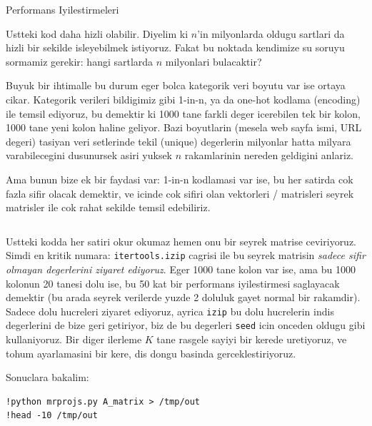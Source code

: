 \documentclass[12pt,fleqn]{article}\usepackage{../common}
\begin{document}
Performans Iyilestirmeleri

Ustteki kod daha hizli olabilir. Diyelim ki $n$'in milyonlarda oldugu
sartlari da hizli bir sekilde isleyebilmek istiyoruz. Fakat bu noktada
kendimize su soruyu sormamiz gerekir: hangi sartlarda $n$ milyonlari
bulacaktir?

Buyuk bir ihtimalle bu durum eger bolca kategorik veri boyutu var ise
ortaya cikar. Kategorik verileri bildigimiz gibi 1-in-n, ya da one-hot
kodlama (encoding) ile temsil ediyoruz, bu demektir ki 1000 tane
farkli deger icerebilen tek bir kolon, 1000 tane yeni kolon haline
geliyor. Bazi boyutlarin (mesela web sayfa ismi, URL degeri) tasiyan
veri setlerinde tekil (unique) degerlerin milyonlar hatta milyara
varabilecegini dusunursek asiri yuksek $n$ rakamlarinin nereden
geldigini anlariz.

Ama bunun bize ek bir faydasi var: 1-in-n kodlamasi var ise, bu her
satirda cok fazla sifir olacak demektir, ve icinde cok sifiri olan
vektorleri / matrisleri seyrek matrisler ile cok rahat sekilde temsil
edebiliriz.

\inputminted[fontsize=\footnotesize]{python}{mrprojs.py}

Ustteki kodda her satiri okur okumaz hemen onu bir seyrek matrise
ceviriyoruz. Simdi en kritik numara: \verb!itertools.izip!
cagrisi ile bu seyrek matrisin {\em sadece sifir olmayan degerlerini
ziyaret ediyoruz}. Eger 1000 tane kolon var ise, ama bu 1000
kolonun 20 tanesi dolu ise, bu 50 kat bir performans iyilestirmesi
saglayacak demektir (bu arada seyrek verilerde yuzde 2 doluluk gayet
normal bir rakamdir). Sadece dolu hucreleri ziyaret ediyoruz, ayrica
\verb!izip! bu dolu hucrelerin indis degerlerini de bize geri
getiriyor, biz de bu degerleri \verb!seed! icin onceden oldugu
gibi kullaniyoruz. Bir diger ilerleme $K$ tane rasgele sayiyi bir
kerede uretiyoruz, ve tohum ayarlamasini bir kere, dis dongu basinda
gerceklestiriyoruz. 

Sonuclara bakalim:

\begin{verbatim}
!python mrprojs.py A_matrix > /tmp/out
!head -10 /tmp/out
\end{verbatim}
\end{document}
